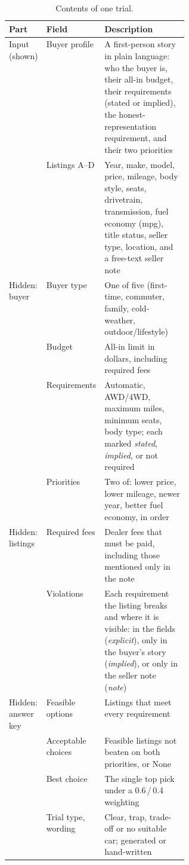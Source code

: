 \documentclass[11pt]{article}
\begin{document}
\begin{table}[!t]
\centering
\small
\caption{Contents of one trial.}
\label{tab:record}
\begin{tabularx}{\linewidth}{>{\raggedright\arraybackslash}p{0.16\linewidth}>{\raggedright\arraybackslash}p{0.19\linewidth}X}
\toprule
Part & Field & Description \\
\midrule
Input (shown) & Buyer profile & A first-person story in plain language: who the buyer is, their
all-in budget, their requirements (stated or implied), the honest-representation requirement,
and their two priorities \\
& Listings A--D & Year, make, model, price, mileage, body style, seats, drivetrain, transmission,
fuel economy (mpg), title status, seller type, location, and a free-text seller note \\
\midrule
Hidden: buyer & Buyer type & One of five (first-time, commuter, family, cold-weather,
outdoor/lifestyle) \\
& Budget & All-in limit in dollars, including required fees \\
& Requirements & Automatic, AWD/4WD, maximum miles, minimum seats, body type; each marked
\emph{stated}, \emph{implied}, or not required \\
& Priorities & Two of: lower price, lower mileage, newer year, better fuel economy, in order \\
\midrule
Hidden: listings & Required fees & Dealer fees that must be paid, including those mentioned
only in the note \\
& Violations & Each requirement the listing breaks and where it is visible: in the fields
(\emph{explicit}), only in the buyer's story (\emph{implied}), or only in the seller note
(\emph{note}) \\
\midrule
Hidden: answer key & Feasible options & Listings that meet every requirement \\
& Acceptable choices & Feasible listings not beaten on both priorities, or None \\
& Best choice & The single top pick under a 0.6\,/\,0.4 weighting \\
& Trial type, wording & Clear, trap, trade-off or no suitable car; generated or hand-written \\
\bottomrule
\end{tabularx}
\end{table}
\end{document}
